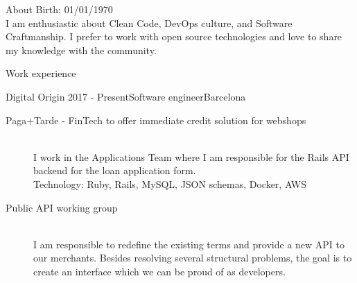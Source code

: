 \documentclass{resume} %
\begin{document}
\begin{rSection}{About}
 Birth: 01/01/1970 \\
 I am enthusiastic about Clean Code, DevOps culture, and Software Craftmanship.
 I prefer to work with open source technologies and love to share my knowledge
 with the community.
\end{rSection}


\begin{rSection}{Work experience}

\begin{rSubsection}{Digital Origin}
{2017 - Present}{Software engineer}{Barcelona}
  \begin{description}
    \item[Paga+Tarde - FinTech to offer immediate credit solution for webshops] \hfill \\
    I work in the Applications Team where I am responsible for the Rails API
    backend for the loan application form.
    \\
    Technology: Ruby, Rails, MySQL, JSON schemas, Docker, AWS
  \end{description}
  \begin{description}
    \item[Public API working group] \hfill \\
    I am responsible to redefine the existing terms and provide a new API to
    our merchants. Besides resolving several structural problems, the goal is
    to create an interface which we can be proud of as developers.
  \end{description}
\end{rSubsection}


\end{rSection}
\end{document}
